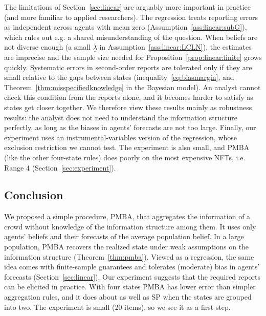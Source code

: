 \documentclass[12pt,reqno]{amsart}
\begin{document}
The limitations of Section~\ref{sec:linear} are arguably more important in practice (and more familiar to applied researchers). The regression treats reporting errors as independent across agents with mean zero (Assumption~\ref{ass:linear:subG}), which rules out e.g. a shared misunderstanding of the question. When beliefs are not diverse enough (a small $\underline\lambda$ in Assumption~\ref{ass:linear:LCLN}), the estimates are imprecise and the sample size needed for Proposition~\ref{prop:linear:finite} grows quickly. Systematic errors in second-order reports are tolerated only if they are small relative to the gaps between states (inequality~\eqref{eq:biasmargin}, and Theorem~\ref{thm:misspecifiedknowledge} in the Bayesian model). An analyst cannot check this condition from the reports alone, and it becomes harder to satisfy as states get closer together. We therefore view these results mainly as robustness results: the analyst does not need to understand the information structure perfectly, as long as the biases in agents' forecasts are not too large. Finally, our experiment uses an instrumental-variables version of the regression, whose exclusion restriction we cannot test. The experiment is also small, and PMBA (like the other four-state rules) does poorly on the most expensive NFTs, i.e. Range 4 (Section~\ref{sec:experiment}).

\subsection{\texorpdfstring{Conclusion}{Conclusion}}
We proposed a simple procedure, PMBA, that aggregates the information of a crowd without knowledge of the information structure among them. It uses only agents' beliefs and their forecasts of the average population belief. In a large population, PMBA recovers the realized state under weak assumptions on the information structure (Theorem~\ref{thm:pmba}). Viewed as a regression, the same idea comes with finite-sample guarantees and tolerates (moderate) bias in agents' forecasts (Section~\ref{sec:linear}). Our experiment suggests that the required reports can be elicited in practice. With four states PMBA has lower error than simpler aggregation rules, and it does about as well as SP when the states are grouped into two. The experiment is small (20 items), so we see it as a first step.






\end{document}
